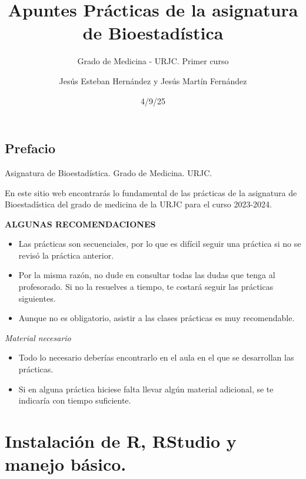 \documentclass[
  letterpaper,
  DIV=11,
  numbers=noendperiod]{scrreprt}
\title{Apuntes Prácticas de la asignatura de Bioestadística}
\subtitle{Grado de Medicina - URJC. Primer curso}
\author{Jesús Esteban Hernández y Jesús Martín Fernández}
\date{4/9/25}
\renewcommand*\contentsname{Table of contents}
\newcommand\contentsname{Table of contents}
\begin{document}
\maketitle
\ifdefined\Shaded\renewenvironment{Shaded}{\begin{tcolorbox}[frame hidden, boxrule=0pt, breakable, sharp corners, interior hidden, borderline west={3pt}{0pt}{shadecolor}, enhanced]}{\end{tcolorbox}}\fi

\renewcommand*\contentsname{Table of contents}
{
\hypersetup{linkcolor=}
\setcounter{tocdepth}{2}
\tableofcontents
}

\hypertarget{prefacio}{%
\chapter{\texorpdfstring{{Prefacio}}{Prefacio}}\label{prefacio}}

Asignatura de Bioestadística. Grado de Medicina. URJC.

\hfill\break

En este sitio web encontrarás lo fundamental de las prácticas de la
asignatura de Bioestadística del grado de medicina de la URJC para el
curso 2023-2024.

\textbf{ALGUNAS RECOMENDACIONES}

\begin{itemize}
\item
  Las prácticas son secuenciales, por lo que es difícil seguir una
  práctica si no se revisó la práctica anterior.
\item
  Por la misma razón, no dude en consultar todas las dudas que tenga al
  profesorado. Si no la resuelves a tiempo, te costará seguir las
  prácticas siguientes.
\item
  Aunque no es obligatorio, asistir a las clases prácticas es muy
  recomendable.
\end{itemize}

\emph{Material necesario}

\begin{itemize}
\item
  Todo lo necesario deberías encontrarlo en el aula en el que se
  desarrollan las prácticas.
\item
  Si en alguna práctica hiciese falta llevar algún material adicional,
  se te indicaría con tiempo suficiente.
\end{itemize}

\part{Instalación de R, RStudio y manejo básico.}
\end{document}
